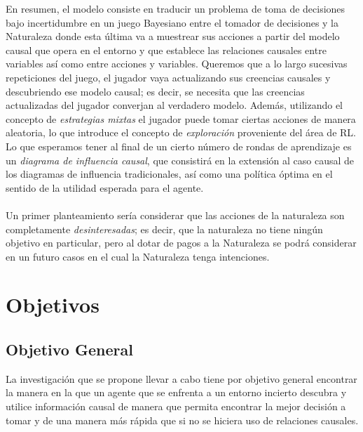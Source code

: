\documentclass[11pt]{article}
\theoremstyle{plain}
\begin{document}
\indent En resumen, el modelo consiste en traducir un problema de toma de decisiones bajo incertidumbre en un juego Bayesiano entre el tomador de decisiones y la Naturaleza donde esta última va a muestrear sus acciones a partir del modelo causal que opera en el entorno y que establece las relaciones causales entre variables así como entre acciones y variables. Queremos que a lo largo sucesivas repeticiones del juego, el jugador vaya actualizando sus creencias causales y descubriendo ese modelo causal; es decir, se necesita que las creencias actualizadas del jugador converjan al verdadero modelo. Además, utilizando el concepto de \textit{estrategias mixtas} el jugador puede tomar ciertas acciones de manera aleatoria, lo que introduce el concepto de \textit{exploración} proveniente del área de RL. Lo que esperamos tener al final de un cierto número de rondas de aprendizaje es un \textit{diagrama de influencia causal}, que consistirá en la extensión al caso causal de los diagramas de influencia tradicionales, así como una política óptima en el sentido de la utilidad esperada para el agente.\\
\\
\indent Un primer planteamiento sería considerar que las acciones de la naturaleza son completamente \textit{desinteresadas}; es decir, que la naturaleza no tiene ningún objetivo en particular, pero al dotar de pagos a la Naturaleza se podrá considerar en un futuro casos en el cual la Naturaleza tenga intenciones.

\section{Objetivos}
\subsection{Objetivo General}
La investigación que se propone llevar a cabo tiene por objetivo general encontrar la manera en la que un agente que se enfrenta a un entorno incierto descubra y utilice información causal de manera que permita encontrar la mejor decisión a tomar y de una manera más rápida que si no se hiciera uso de relaciones causales.
\end{document}
